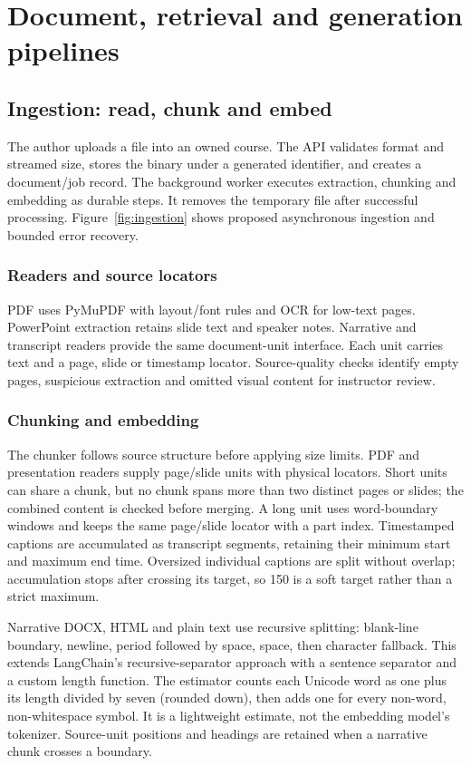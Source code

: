 \clearpage\section{Document, retrieval and generation pipelines}
\subsection{Ingestion: read, chunk and embed}
The author uploads a file into an owned course. The API validates format and streamed size, stores the binary under a generated identifier, and creates a document/job record. The background worker executes extraction, chunking and embedding as durable steps. It removes the temporary file after successful processing.
Figure~\ref{fig:ingestion} shows proposed asynchronous ingestion and bounded error recovery.
\subsubsection{Readers and source locators}
PDF uses PyMuPDF with layout/font rules and OCR for low-text pages. PowerPoint extraction retains slide text and speaker notes. Narrative and transcript readers provide the same document-unit interface. Each unit carries text and a page, slide or timestamp locator. Source-quality checks identify empty pages, suspicious extraction and omitted visual content for instructor review.
\subsubsection{Chunking and embedding}\label{sec:chunking}
The chunker follows source structure before applying size limits. PDF and presentation readers supply page/slide units with physical locators. Short units can share a chunk, but no chunk spans more than two distinct pages or slides; the combined content is checked before merging. A long unit uses word-boundary windows and keeps the same page/slide locator with a part index. Timestamped captions are accumulated as transcript segments, retaining their minimum start and maximum end time. Oversized individual captions are split without overlap; accumulation stops after crossing its target, so 150 is a soft target rather than a strict maximum.

Narrative DOCX, HTML and plain text use recursive splitting: blank-line boundary, newline, period followed by space, space, then character fallback. This extends LangChain's recursive-separator approach with a sentence separator and a custom length function\citep{recursivesplit}. The estimator counts each Unicode word as one plus its length divided by seven (rounded down), then adds one for every non-word, non-whitespace symbol. It is a lightweight estimate, not the embedding model's tokenizer. Source-unit positions and headings are retained when a narrative chunk crosses a boundary.

